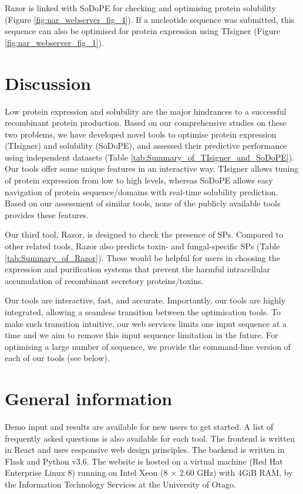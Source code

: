 Razor is linked with SoDoPE for checking and optimising protein
solubility (Figure \ref{fig:nar_webserver_fig_4}). If a nucleotide sequence was submitted, this sequence can
also be optimised for protein expression using TIsigner (Figure \ref{fig:nar_webserver_fig_1}).


\section{Discussion}
Low protein expression and solubility are the major hindrances to a successful recombinant protein production. Based on our comprehensive studies on these two problems, we have developed novel tools to optimise protein expression (TIsigner) and solubility (SoDoPE), and assessed their predictive performance using independent datasets (Table \ref{tab:Summary_of_TIsigner_and_SoDoPE}). Our tools offer some unique features in an interactive way. TIsigner allows tuning of protein expression from low to high levels, whereas SoDoPE allows easy navigation of protein sequence/domains with real-time solubility prediction. Based on our assessment of similar tools, none of the publicly available tools provides these features.

Our third tool, Razor, is designed to check the presence of SPs. Compared to other related tools, Razor also predicts toxin- and fungal-specific SPs (Table \ref{tab:Summary_of_Razor}). These would be helpful for users in choosing the expression and purification systems that prevent the harmful intracellular accumulation of recombinant secretory proteins/toxins. 

Our tools are interactive, fast, and accurate. Importantly, our tools are highly integrated, allowing a seamless transition between the optimisation tools. To make such transition intuitive, our web services limits one input sequence at a time and we aim to remove this input sequence limitation in the future. For optimising a large number of sequence, we provide the command-line version of each of our tools (see below).


\section{General information}

Demo input and results are available for new users to get started. A
list of frequently asked questions is also available for each tool. The
frontend is written in React and uses responsive web design principles.
The backend is written in Flask and Python v3.6. The website is hosted on
a virtual machine (Red Hat Enterprise Linux 8) running on Intel Xeon (8
${\times}$ 2.60 GHz) with 4GiB RAM, by the Information Technology Services at the
University of Otago.


